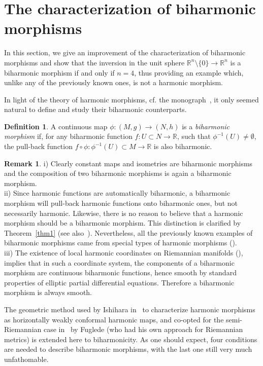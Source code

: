 \documentclass[12pt]{amsart}
\theoremstyle{plain}
\theoremstyle{definition}
\newtheorem{de}{Definition}
\newtheorem{rk}{Remark}
\begin{document}
\section{The characterization of biharmonic morphisms}\label{section1}

In this section, we give an improvement of the characterization of biharmonic
morphisms and show that the inversion in the unit sphere ${{\mathbb R}}^n \setminus \{0\} \to
{{\mathbb R}}^n$ is a biharmonic morphism if and only if $n=4$, thus providing an example
which, unlike any of the previously known ones, is not a harmonic morphism.

In light of the theory of harmonic morphisms, cf. the monograph~\cite{B-W}, it only
seemed natural to define and study their biharmonic counterparts.

\begin{de}
A continuous map $\phi : (M,g) \to (N,h)$ is a {\em biharmonic morphism} if, for any
biharmonic function $f : U\subset N \to {{\mathbb R}}$, such that $\phi^{-1}(U)\neq \emptyset$,
the pull-back function $f\circ\phi : \phi^{-1}(U) \subset M \to {{\mathbb R}}$ is also
biharmonic.
\end{de}

\begin{rk}
i) Clearly constant maps and isometries are biharmonic morphisms and the composition
of
two biharmonic morphisms is again a biharmonic morphism.\\
ii) Since harmonic functions are automatically biharmonic, a biharmonic morphism will
pull-back harmonic functions onto biharmonic ones, but not necessarily harmonic.
Likewise, there is no reason to believe that a harmonic morphism should be a
biharmonic morphism. This distinction is clarified by Theorem~\ref{thm1} (see
also~\cite{L-O}).
Nevertheless, all the previously known examples of biharmonic morphisms came from special types of harmonic morphisms (\cite{L-O,OuB,Ou}).\\
iii) The existence of local harmonic coordinates on Riemannian manifolds
(\cite{D-K}), implies that in such a coordinate system, the components of a
biharmonic morphism are continuous biharmonic functions, hence smooth by standard
properties of elliptic partial differential equations. Therefore a biharmonic
morphism is always smooth.
\end{rk}

The geometric method used by Ishihara in~\cite{Ish} to characterize harmonic
morphisms as horizontally weakly conformal harmonic maps, and co-opted for the
semi-Riemannian case in~\cite{Fug96} by Fuglede (who had his own approach for
Riemannian metrics) is extended here to biharmonicity. As one should expect, four
conditions are needed to describe biharmonic morphisms, with the last one still very
much unfathomable.
\end{document}
